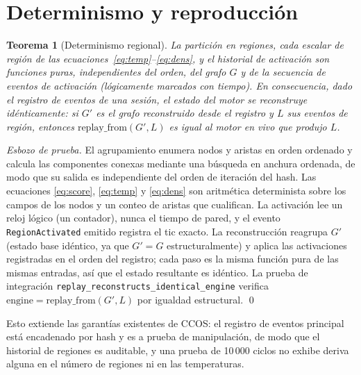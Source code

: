 \documentclass[11pt]{article}
\newtheorem{theorem}{Teorema}
\newcommand{\code}[1]{\texttt{#1}}
\begin{document}
\section{Determinismo y reproducción}\label{sec:determinism}

\begin{theorem}[Determinismo regional]
La partición en regiones, cada escalar de región de las
ecuaciones~\eqref{eq:temp}--\eqref{eq:dens}, y el historial de activación son
funciones puras, independientes del orden, del grafo $G$ y de la secuencia de eventos
de activación (lógicamente marcados con tiempo). En consecuencia, dado el registro de
eventos de una sesión, el estado del motor se reconstruye idénticamente: si $G'$ es el
grafo reconstruido desde el registro y $L$ sus eventos de región, entonces
$\mathrm{replay\_from}(G',L)$ es igual al motor en vivo que produjo $L$.
\end{theorem}
\begin{proof}[Esbozo de prueba]
El agrupamiento enumera nodos y aristas en orden ordenado y calcula las componentes
conexas mediante una búsqueda en anchura ordenada, de modo que su salida es
independiente del orden de iteración del hash. Las ecuaciones \eqref{eq:score},
\eqref{eq:temp} y \eqref{eq:dens} son aritmética determinista sobre los campos de los
nodos y un conteo de aristas que cualifican. La activación lee un reloj lógico (un
contador), nunca el tiempo de pared, y el evento \code{RegionActivated} emitido
registra el tic exacto. La reconstrucción reagrupa $G'$ (estado base idéntico, ya que
$G'\!=\!G$ estructuralmente) y aplica las activaciones registradas en el orden del
registro; cada paso es la misma función pura de las mismas entradas, así que el estado
resultante es idéntico. La prueba de integración
\code{replay\_reconstructs\_identical\_engine} verifica
$\mathrm{engine}=\mathrm{replay\_from}(G',L)$ por igualdad estructural. \qed
\end{proof}

Esto extiende las garantías existentes de CCOS: el registro de eventos principal está
encadenado por hash y es a prueba de manipulación, de modo que el historial de
regiones es auditable, y una prueba de 10\,000 ciclos no exhibe deriva alguna en el
número de regiones ni en las temperaturas.
\end{document}
